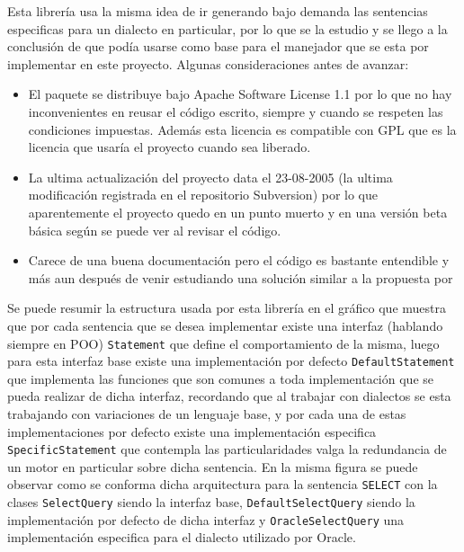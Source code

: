 Esta librería  usa la misma idea de ir generando bajo demanda las sentencias especificas para un dialecto en particular, por lo que se la estudio y se llego a la conclusión de que podía usarse como base para el manejador que se esta por implementar en este proyecto. Algunas consideraciones antes de avanzar:
%
\begin{itemize}
\item El paquete se distribuye bajo Apache Software License 1.1 por lo que no hay inconvenientes en reusar el código escrito, siempre y cuando se respeten las condiciones impuestas. Además esta licencia es compatible con GPL que es la licencia que usaría el proyecto cuando sea liberado.
\item La ultima actualización del proyecto data el 23-08-2005 (la ultima modificación registrada en el repositorio Subversion) por lo que aparentemente el proyecto quedo en un punto muerto y en una versión beta básica según se puede ver al revisar el código.
\item Carece de una buena documentación pero el código es bastante entendible y más aun después de venir estudiando una solución similar a la propuesta por \cc
\end{itemize}
%
Se puede resumir la estructura usada por esta librería en el gráfico  que muestra que por cada sentencia que se desea implementar existe una interfaz (hablando siempre en POO) \verb=Statement= que define el comportamiento de la misma, luego para esta interfaz base existe una implementación por defecto \verb=DefaultStatement= que implementa las funciones que son comunes a toda implementación que se pueda realizar de dicha interfaz, recordando que al trabajar con dialectos se esta trabajando con variaciones de un lenguaje base, y por cada una de estas implementaciones por defecto existe una implementación especifica \verb=SpecificStatement= que contempla las particularidades valga la redundancia de un motor en particular sobre dicha sentencia. En la misma figura se puede observar como se conforma dicha arquitectura para la sentencia \verb=SELECT= con la clases \verb=SelectQuery= siendo la interfaz base, \verb=DefaultSelectQuery= siendo la implementación por defecto de dicha interfaz y \verb=OracleSelectQuery= una implementación especifica para el dialecto utilizado por Oracle.
%
%
